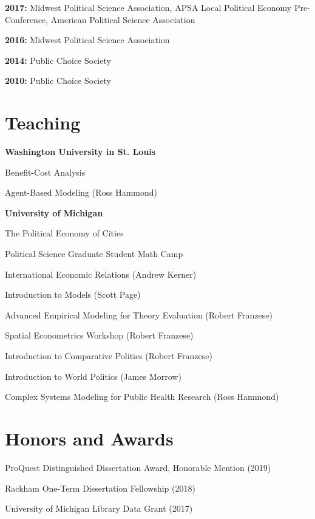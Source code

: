 \documentclass[margin,line]{res}
\newenvironment{list1}{
  \begin{list}{}{%
      \setlength{\itemsep}{0.1in}
      \setlength{\parsep}{0in} \setlength{\parskip}{0in}
      \setlength{\topsep}{0.1in} \setlength{\partopsep}{0in} 
      \setlength{\leftmargin}{0.17in}}}{\end{list}}
\begin{document}
\begin{resume}
\textbf{2017:} Midwest Political Science Association, APSA Local Political Economy Pre-Conference, American Political Science Association

\textbf{2016:} Midwest Political Science Association

\textbf{2014:} Public Choice Society

\textbf{2010:} Public Choice Society


\section{\sc Teaching}

\textbf{Washington University in St. Louis}
\begin{list1}
	\item[] Benefit-Cost Analysis
	\item[] Agent-Based Modeling (Ross Hammond)
\end{list1}

\textbf{University of Michigan}
\begin{list1}
	\item[] The Political Economy of Cities
	\item[] Political Science Graduate Student Math Camp
	\item International Economic Relations (Andrew Kerner)
	\item Introduction to Models (Scott Page)
	\item Advanced Empirical Modeling for Theory Evaluation (Robert Franzese)
	\item Spatial Econometrics Workshop (Robert Franzese)
	\item Introduction to Comparative Politics (Robert Franzese)
	\item Introduction to World Politics (James Morrow)
	\item Complex Systems Modeling for Public Health Research (Ross Hammond)
\end{list1}



\section{\sc Honors and Awards} 

ProQuest Distinguished Dissertation Award, Honorable Mention (2019)

Rackham One-Term Dissertation Fellowship (2018)

University of Michigan Library Data Grant (2017)


\end{resume}
\end{document}
